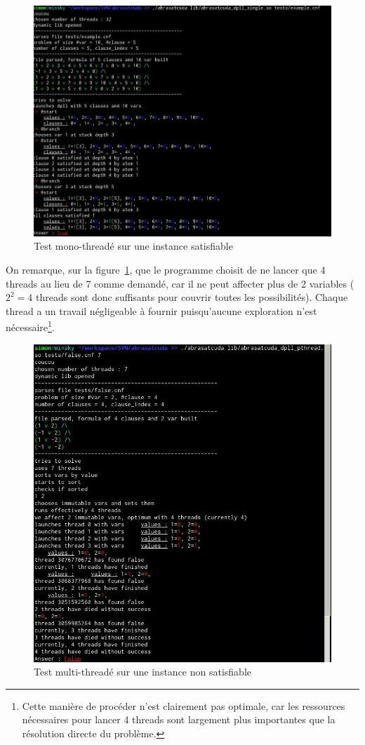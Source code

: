 \documentclass{article}
\begin{document}
\begin{figure}[hp]
\includegraphics[width = 1.0\textwidth]{./all.jpg}
  \caption[mono-threadé]{Test mono-threadé sur une instance satisfiable}
\end{figure}

On remarque, sur la figure~\ref{multiThread}, que le programme choisit de ne lancer que 4 threads au lieu de 7 comme demandé, car il ne peut affecter plus de 2 variables ($2^{2}= 4$ threads sont donc suffisants pour couvrir toutes les possibilités). Chaque thread a un travail négligeable à fournir puisqu'aucune exploration n'est nécessaire\footnote{Cette manière de procéder n'est clairement pas optimale, car les ressources nécessaires pour lancer 4 threads sont largement plus importantes que la résolution directe du problème.}. 

\begin{figure}[hp]
\includegraphics[width = 1.0\textwidth]{./pthread.jpg}
  \caption[multi-threadé]{Test multi-threadé sur une instance non satisfiable}
  \label{multiThread}
\end{figure}
\end{document}
